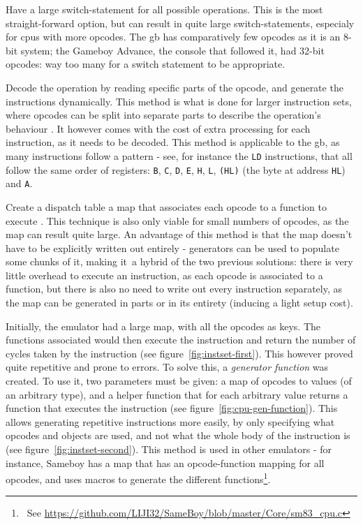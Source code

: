 \documentclass[11pt]{informatics-report}
\newcommand{\ftnt}[1]{\footnote{~See \url{#1}}}
\begin{document}
\begin{compactitem}
    \item Have a large switch-statement for all possible operations. This is the most straight-forward option, but can result in quite large switch-statements, especialy for \glspl{cpu} with more opcodes. The \gls{gb} has comparatively few opcodes as it is an 8-bit system; the Gameboy Advance, the console that followed it, had 32-bit opcodes: way too many for a switch statement to be appropriate.
    \item Decode the operation by reading specific parts of the opcode, and generate the instructions dynamically. This method is what is done for larger instruction sets, where opcodes can be split into separate parts to describe the operation's behaviour \cite[ARM CPU Reference]{gbatek}. It however comes with the cost of extra processing for each instruction, as it needs to be decoded. This method is applicable to the \gls{gb}, as many instructions follow a pattern - see, for instance the \texttt{LD} instructions, that all follow the same order of registers: \texttt{B}, \texttt{C}, \texttt{D}, \texttt{E}, \texttt{H}, \texttt{L}, \texttt{(HL)} (the byte at address \texttt{HL}) and \texttt{A}.
    \item Create a dispatch table a map that associates each opcode to a function to execute \cite{dispatch_table}. This technique is also only viable for small numbers of opcodes, as the map can result quite large. An advantage of this method is that the map doesn't have to be explicitly written out entirely - generators can be used to populate some chunks of it, making it a hybrid of the two previous solutions: there is very little overhead to execute an instruction, as each opcode is associated to a function, but there is also no need to write out every instruction separately, as the map can be generated in parts or in its entirety (inducing a light setup cost).
\end{compactitem}

Initially, the emulator had a large map, with all the opcodes as keys. The functions associated would then execute the instruction and return the number of cycles taken by the instruction (see figure~\ref{fig:instset-first}). This however proved quite repetitive and prone to errors. To solve this, a \textit{generator function} was created. To use it, two parameters must be given: a map of opcodes to values (of an arbitrary type), and a helper function that for each arbitrary value returns a function that executes the instruction (see figure~\ref{fig:cpu-gen-function}). This allows generating repetitive instructions more easily, by only specifying what opcodes and objects are used, and not what the whole body of the instruction is (see figure~\ref{fig:instset-second}). This method is used in other emulators - for instance, Sameboy has a map that has an opcode-function mapping for all opcodes, and uses macros to generate the different functions\ftnt{https://github.com/LIJI32/SameBoy/blob/master/Core/sm83\_cpu.c}.
\end{document}
